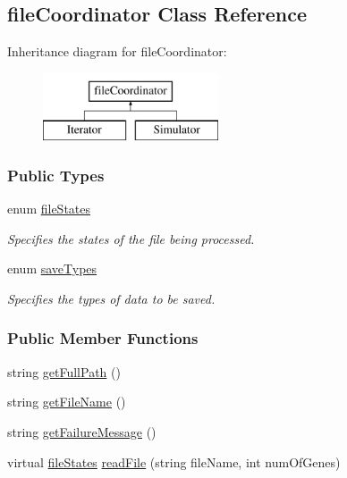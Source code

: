 \hypertarget{classfile_coordinator}{\subsection{file\+Coordinator Class Reference}
\label{classfile_coordinator}
}
Inheritance diagram for file\+Coordinator\+:\begin{figure}[H]
\begin{center}
\leavevmode
\includegraphics[height=2.000000cm]{classfile_coordinator}
\end{center}
\end{figure}
\subsubsection*{Public Types}
\begin{DoxyCompactItemize}
\item 
enum \hyperlink{classfile_coordinator_ab3cb53f40d14c0d8f5c5c822331ffd72}{file\+States} 
\begin{DoxyCompactList}\small\item\em Specifies the states of the file being processed. \end{DoxyCompactList}\item 
enum \hyperlink{classfile_coordinator_abe0581895323a5bbab5713fe662700f7}{save\+Types} 
\begin{DoxyCompactList}\small\item\em Specifies the types of data to be saved. \end{DoxyCompactList}\end{DoxyCompactItemize}
\subsubsection*{Public Member Functions}
\begin{DoxyCompactItemize}
\item 
string \hyperlink{classfile_coordinator_a0693917f4f45d1659cb42b38b23765c0}{get\+Full\+Path} ()
\item 
string \hyperlink{classfile_coordinator_a2413ab134b39548479ce09b16d346ff7}{get\+File\+Name} ()
\item 
string \hyperlink{classfile_coordinator_af8f546fb6df593ebb1ddf2d3360abe09}{get\+Failure\+Message} ()
\item 
virtual \hyperlink{classfile_coordinator_ab3cb53f40d14c0d8f5c5c822331ffd72}{file\+States} \hyperlink{classfile_coordinator_a2df45315b79719144f8fb1240e56501a}{read\+File} (string file\+Name, int num\+Of\+Genes)
\end{DoxyCompactItemize}


